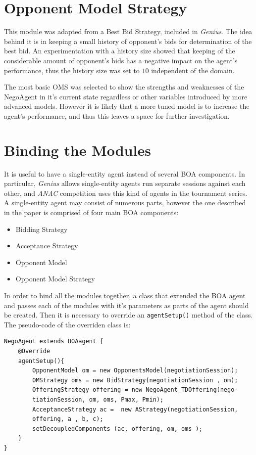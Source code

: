 \documentclass[html]{report}    %
\begin{document}
\section{Opponent Model Strategy}  

This module was adapted from a Best Bid Strategy, included in \textit{Genius}. The idea behind it is in keeping a small history of opponent's bids for determination of the best bid. An experimentation with a history size showed that keeping of the considerable amount of opponent's bids has a negative impact on the agent's performance, thus the history size was set to $10$ independent of the domain.

The most basic OMS was selected to show the strengths and weaknesses of the NegoAgent in it's current state regardless or other variables introduced by more advanced models. However it is likely that a more tuned model is to increase the agent's performance, and thus this leaves a space for further investigation.

\section{Binding the Modules}

It is useful to have a single-entity agent instead of several BOA components. In particular, \textit{Genius} allows single-entity agents run separate sessions against each other, and \textit{ANAC} competition uses this kind of agents in the tournament series. A single-entity agent may consist of numerous parts, however the one described in the paper is comprised of four main BOA components:
\begin{itemize}
	\item Bidding Strategy
	\item Acceptance Strategy
	\item Opponent Model
	\item Opponent Model Strategy
\end{itemize}

In order to bind all the modules together, a class that extended the BOA agent and passes each of the modules with it's parameters as parts of the agent should be created. Then it is necessary to override an \texttt{agentSetup()} method of the class. The pseudo-code of the overriden class is:

\begin{verbatim}
NegoAgent extends BOAagent {    
    @Override
    agentSetup(){
        OpponentModel om = new OpponentsModel(negotiationSession);
        OMStrategy oms = new BidStrategy(negotiationSession , om);
        OfferingStrategy offering = new NegoAgent_TDOffering(nego-
        tiationSession, om, oms, Pmax, Pmin);
        AcceptanceStrategy ac =  new AStrategy(negotiationSession,
        offering, a , b, c);
        setDecoupledComponents (ac, offering, om, oms );
    }
}
\end{verbatim}
\end{document}
